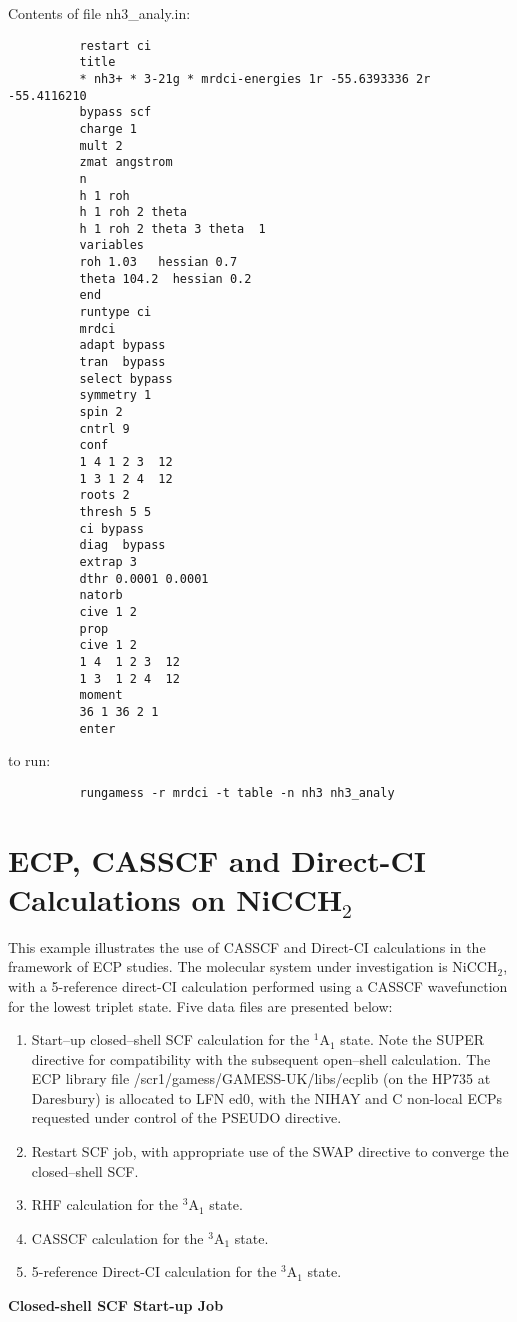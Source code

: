 \documentclass[11pt,fleqn]{article}
\newcommand{\nimeth}{\mbox{NiCCH$_{2}$}}
\begin{document}
Contents of file nh3\_analy.in:
{
\footnotesize
\begin{verbatim}
          restart ci
          title
          * nh3+ * 3-21g * mrdci-energies 1r -55.6393336 2r -55.4116210
          bypass scf
          charge 1
          mult 2
          zmat angstrom
          n
          h 1 roh
          h 1 roh 2 theta
          h 1 roh 2 theta 3 theta  1
          variables
          roh 1.03   hessian 0.7
          theta 104.2  hessian 0.2
          end
          runtype ci
          mrdci
          adapt bypass
          tran  bypass
          select bypass
          symmetry 1
          spin 2
          cntrl 9
          conf
          1 4 1 2 3  12
          1 3 1 2 4  12
          roots 2
          thresh 5 5
          ci bypass
          diag  bypass
          extrap 3
          dthr 0.0001 0.0001
          natorb
          cive 1 2
          prop
          cive 1 2
          1 4  1 2 3  12
          1 3  1 2 4  12
          moment
          36 1 36 2 1
          enter
\end{verbatim}
}
to run:
{
\footnotesize
\begin{verbatim}
          rungamess -r mrdci -t table -n nh3 nh3_analy
\end{verbatim}
}
\section[ECP, CASSCF and Direct-CI Calculations on \nimeth]{ECP, CASSCF and Direct-CI Calculations on \nimeth}
This example illustrates the use of CASSCF and Direct-CI
calculations in the framework of ECP studies. The molecular system
under investigation is \nimeth, with a 5-reference 
direct-CI calculation performed using a
CASSCF wavefunction for the lowest triplet state. Five data files are
presented below:
\begin{enumerate}
\item Start--up closed--shell SCF calculation for
the $^{1}$A$_{1}$ state. Note the SUPER directive
for compatibility with the subsequent open--shell calculation.
The ECP library file /scr1/gamess/GAMESS-UK/libs/ecplib (on the HP735 at
Daresbury) is allocated to LFN ed0, 
with the
NIHAY and C non-local ECPs requested under control
of the PSEUDO directive.
\item Restart SCF job, with appropriate use of the
SWAP directive to converge the closed--shell SCF.
\item RHF calculation for the $^{3}$A$_{1}$ state.
\item CASSCF calculation for the $^{3}$A$_{1}$ state.
\item 5-reference Direct-CI  calculation for the $^{3}$A$_{1}$ state.
\end{enumerate}
{\bf Closed-shell SCF Start-up Job}\\
\end{document}

